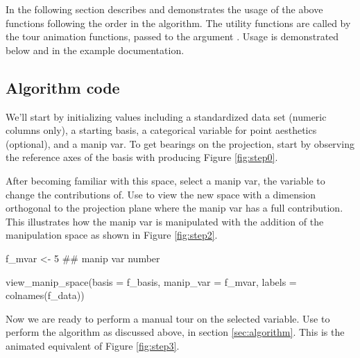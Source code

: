 In the following section describes and demonstrates the usage of the
above functions following the order in the algorithm. The utility
functions are called by the tour animation functions, passed to the
argument . Usage is demonstrated below and in the
example documentation.

\hypertarget{algorithm-code}{%
\subsection{Algorithm code}\label{algorithm-code}}

We'll start by initializing values including a standardized data set
(numeric columns only), a starting basis, a categorical variable for
point aesthetics (optional), and a manip var. To get bearings on the
projection, start by observing the reference axes of the basis with
 producing Figure \ref{fig:step0}.

\begin{Schunk}
\end{Schunk}

After becoming familiar with this space, select a manip var, the
variable to change the contributions of. Use 
to view the new space with a dimension orthogonal to the projection
plane where the manip var has a full contribution. This illustrates how
the manip var is manipulated with the addition of the manipulation space
as shown in Figure \ref{fig:step2}.

\begin{Schunk}
\begin{Sinput}
f_mvar  <- 5  ## manip var number

view_manip_space(basis = f_basis, 
                 manip_var = f_mvar, 
                 labels = colnames(f_data))
\end{Sinput}
\end{Schunk}

Now we are ready to perform a manual tour on the selected variable. Use
 to perform the algorithm as discussed above,
in section \ref{sec:algorithm}. This is the animated equivalent of
Figure \ref{fig:step3}.

